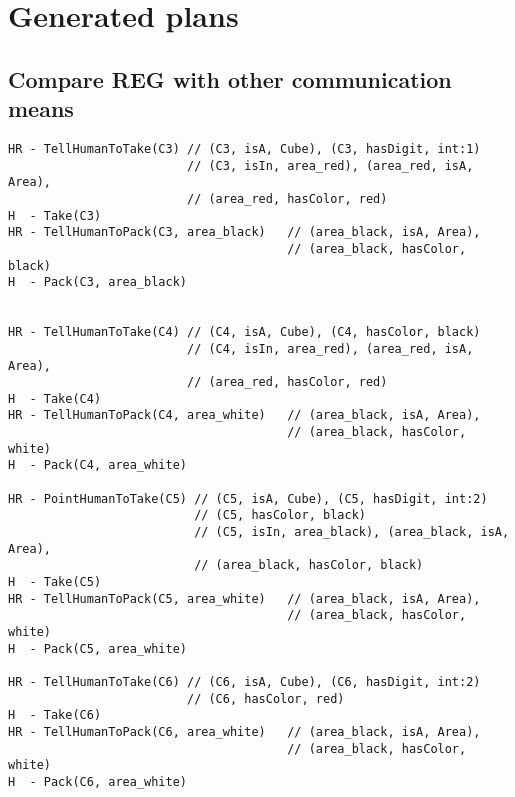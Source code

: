 \chapter{Generated plans}
\label{app:plans}

\section{Compare REG with other communication means}

\begin{lstlisting}[frame=single, basicstyle=\scriptsize\ttfamily, label={lst:chap5_case3}, caption={The HATP solution for the third case study of the chapter \ref{chap:5}. The robot chooses to point instead of verbalizing to designate the cubes 5 and 7. Please note the order of cube motions is not considered in this problem. The lines beginning with H represent the actions of the human and the lines beginning with HR represent actions involving the human and the robot (communication actions). In green are the REG results for each communication action even if a pointing has been choose.}, captionpos=t, style=HatpPlan]
HR - TellHumanToTake(C3) // (C3, isA, Cube), (C3, hasDigit, int:1)
                         // (C3, isIn, area_red), (area_red, isA, Area),
                         // (area_red, hasColor, red)
H  - Take(C3)
HR - TellHumanToPack(C3, area_black)   // (area_black, isA, Area),
                                       // (area_black, hasColor, black)
H  - Pack(C3, area_black)


HR - TellHumanToTake(C4) // (C4, isA, Cube), (C4, hasColor, black)
                         // (C4, isIn, area_red), (area_red, isA, Area),
                         // (area_red, hasColor, red)
H  - Take(C4)
HR - TellHumanToPack(C4, area_white)   // (area_black, isA, Area),
                                       // (area_black, hasColor, white)
H  - Pack(C4, area_white)

HR - PointHumanToTake(C5) // (C5, isA, Cube), (C5, hasDigit, int:2)
                          // (C5, hasColor, black)
                          // (C5, isIn, area_black), (area_black, isA, Area),
                          // (area_black, hasColor, black)
H  - Take(C5)
HR - TellHumanToPack(C5, area_white)   // (area_black, isA, Area),
                                       // (area_black, hasColor, white)
H  - Pack(C5, area_white)

HR - TellHumanToTake(C6) // (C6, isA, Cube), (C6, hasDigit, int:2)
                         // (C6, hasColor, red)
H  - Take(C6)
HR - TellHumanToPack(C6, area_white)   // (area_black, isA, Area),
                                       // (area_black, hasColor, white)
H  - Pack(C6, area_white)


\end{lstlisting}
